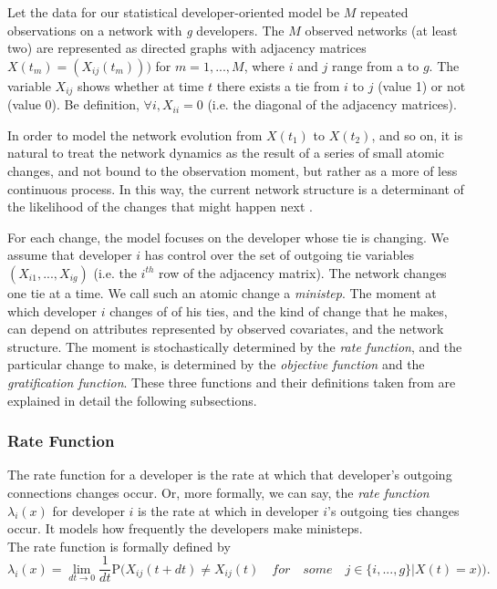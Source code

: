 \documentclass[11pt]{report}
\begin{document}
Let the data for our statistical developer-oriented model be $M$ repeated observations on a network with \textit{g} developers. The $M$ observed networks (at least two) are represented as directed graphs with adjacency matrices $X(t_m) = (X_{ij}(t_m)))$ for $m = 1,...,M$, where $i$ and $j$ range from a to $g$. The variable $X_{ij}$ shows whether at time $t$ there exists a tie from $i$ to $j$ (value 1) or not (value 0). Be definition, $\forall i, X_{ii}=0$ (i.e. the diagonal of the adjacency matrices).

In order to model the network evolution from $X(t_1)$ to $X(t_2)$, and so on, it is natural to treat the network dynamics as the result of a series of small atomic changes, and not bound to the observation moment, but rather as a more of less continuous process. In this way, the current network structure is a determinant of the likelihood of the changes that might happen next \cite{Coleman1964}. 

For each change, the model focuses on the developer whose tie is changing. We assume that developer $i$ has control over the set of outgoing  tie variables $(X_{i1}, ..., X_{ig})$ (i.e. the $i^{th}$ row of the adjacency matrix). The network changes one tie at a time. We call such an atomic change a \textit{ministep}. The moment at which developer $i$ changes of of his ties, and the kind of change that he makes, can depend on attributes represented by observed covariates, and the network structure. The moment is stochastically determined by the \textit{rate function}, and the particular change to make, is determined by the \textit{objective function} and the \textit{gratification function}. These three functions and their definitions taken from \cite{Snijders2004} are explained in detail the following subsections.

\subsubsection{Rate Function}

The rate function for a developer is the rate at which that developer's outgoing connections changes occur. Or, more formally, we can say, the \textit{rate function} $\lambda_i(x)$ for developer $i$ is the rate at which in developer $i$'s outgoing ties changes occur. It models how frequently the developers make ministeps.\\
The rate function is formally defined \cite{Snijders2004} by
\begin{equation}
\lambda_i(x) = \lim_{dt \to 0} \frac{1}{dt} \mathrm {P} \big({X_{ij}(t + dt) \neq X_{ij}(t) \quad for \quad some \quad j \in \{i, ..., g\} | X(t) = x)}\big).
\end{equation}
\end{document}
